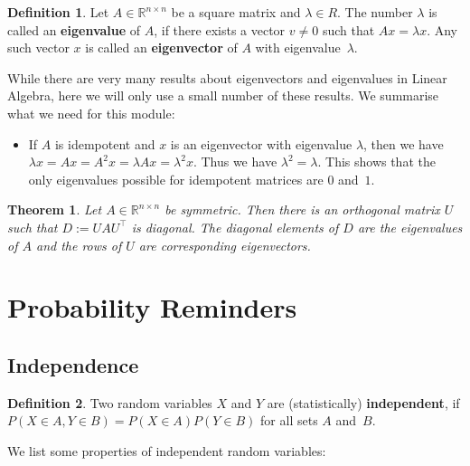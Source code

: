 \documentclass[
  a4paper,
]{article}
\providecommand{\tightlist}{%
  \setlength{\itemsep}{0pt}\setlength{\parskip}{0pt}}
\newtheorem{theorem}{Theorem}[section]
\theoremstyle{definition}
\newtheorem{definition}{Definition}[section]
\theoremstyle{definition}
\theoremstyle{definition}
\theoremstyle{definition}
\theoremstyle{remark}
\begin{document}
\begin{definition}
Let \(A \in\mathbb{R}^{n\times n}\) be a square matrix and \(\lambda\in R\).
The number \(\lambda\) is called an \textbf{eigenvalue} of \(A\), if there
exists a vector \(v \neq 0\) such that \(A x = \lambda x\). Any
such vector \(x\) is called an \textbf{eigenvector} of \(A\) with eigenvalue~\(\lambda\).
\end{definition}

While there are very many results about eigenvectors and eigenvalues
in Linear Algebra, here we will only use a small number of these results.
We summarise what we need for this module:

\begin{itemize}
\tightlist
\item
  If \(A\) is idempotent and \(x\) is an eigenvector with eigenvalue \(\lambda\),
  then we have \(\lambda x = A x = A^2 x = \lambda Ax = \lambda^2 x\). Thus we
  have \(\lambda^2 = \lambda\). This shows that the only eigenvalues possible
  for idempotent matrices are \(0\) and~\(1\).
\end{itemize}

\begin{theorem}
\protect\hypertarget{thm:spectral}{}\label{thm:spectral}Let \(A\in\mathbb{R}^{n\times n}\) be symmetric. Then there is an orthogonal
matrix \(U\) such that \(D := U A U^\top\) is diagonal. The diagonal
elements of \(D\) are the eigenvalues of \(A\) and the rows of \(U\)
are corresponding eigenvectors.
\end{theorem}

\clearpage

\hypertarget{Sx2-probability}{%
\section{Probability Reminders}\label{Sx2-probability}}

\hypertarget{independence}{%
\subsection{Independence}\label{independence}}

\begin{definition}
Two random variables \(X\) and \(Y\) are (statistically) \textbf{independent}, if
\(P(X\in A, Y\in B) = P(X\in A) P(Y\in B)\) for all sets \(A\) and~\(B\).
\end{definition}

We list some properties of independent random variables:
\end{document}
